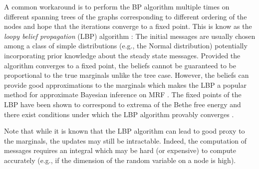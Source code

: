A common workaround is to perform the BP algorithm multiple times on different spanning trees of the graphs corresponding to different ordering of the nodes and hope that the iterations converge to a fixed point. This is know as the \emph{loopy belief propagation} (LBP) algorithm \citep{pearl88, yedidia02}:
%
%
The initial messages are usually chosen among a class of simple distributions (e.g., the Normal distribution) potentially incorporating prior knowledge about the steady state messages. 
Provided the algorithm converges to a fixed point, the beliefs cannot be guaranteed to be proportional to the true marginals unlike the tree case. However, the beliefs can provide good approximations to the marginals which makes the LBP a popular method for approximate Bayesian inference on MRF \citep{sudderth03}. The fixed points of the LBP have been shown to correspond to extrema of the Bethe free energy \citep{yedidia02} and there exist conditions under which the LBP algorithm provably converges \citep{heskes04,ihler05}.

Note that while it is known that the LBP algorithm can lead to good proxy to the marginals, the updates may still be intractable. Indeed, the computation of messages requires an integral which may be hard (or expensive) to compute accurately (e.g., if the dimension of the random variable on a node is high).







